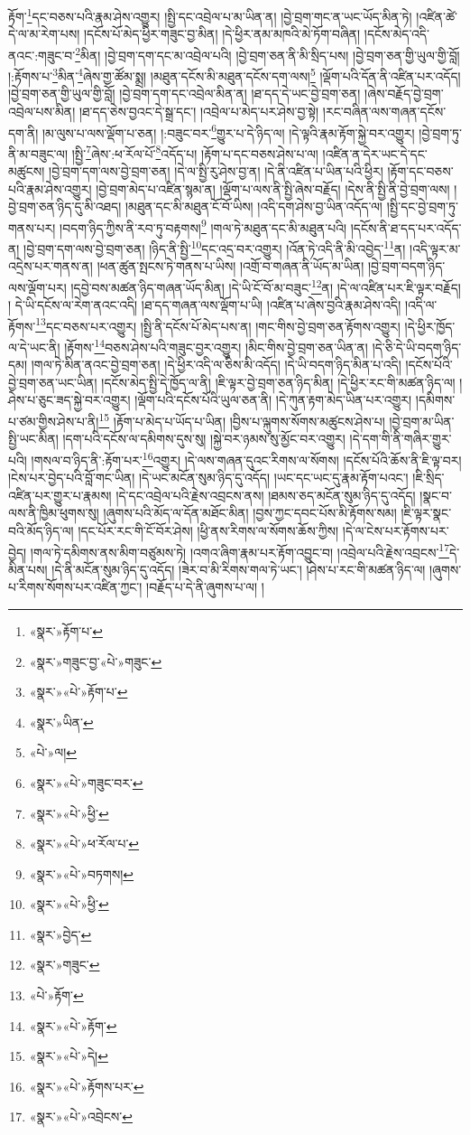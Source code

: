 རྟོག་\footnote{«སྣར་»རྟོག་པ་}དང་བཅས་པའི་རྣམ་ཤེས་འགྱུར། །སྤྱི་དང་འབྲེལ་པ་མ་ཡིན་ན། །བྱེ་བྲག་གང་ན་ཡང་ཡོད་མིན་ཏེ། །འཛིན་ཚེ་དེ་ལ་མ་རེག་པས། །དངོས་པོ་མེད་ཕྱིར་གཟུང་བྱ་མིན། །དེ་ཕྱིར་ནམ་མཁའི་མེ་ཏོག་བཞིན། །དངོས་མེད་འདི་ནའང་:གཟུང་བ་\footnote{«སྣར་»གཟུང་བྱ་«པེ་»གཟུང་}མིན། །བྱེ་བྲག་དག་དང་མ་འབྲེལ་པའི། །བྱེ་བྲག་ཅན་ནི་མི་སྲིད་པས། །བྱེ་བྲག་ཅན་གྱི་ཡུལ་གྱི་བློ། །:རྟོགས་པ་\footnote{«སྣར་»«པེ་»རྟོག་པ་}མིན་\footnote{«སྣར་»ཡིན་}ཞེས་གྱ་ཚོམ་སྨྲ། །མཐུན་དངོས་མི་མཐུན་དངོས་དག་ལས།\footnote{«པེ་»ལ།} །ལྡོག་པའི་དོན་ནི་འཛིན་པར་འདོད། །བྱེ་བྲག་ཅན་གྱི་ཡུལ་གྱི་བློ། །བྱེ་བྲག་དག་དང་འབྲེལ་མིན་ན། །ཐ་དད་དེ་ཡང་བྱེ་བྲག་ཅན། །ཞེས་བརྗོད་བྱེ་བྲག་འབྲེལ་པས་མིན། །ཐ་དད་ཅེས་བྱའང་དེ་སྒྲ་དང་། །འབྲེལ་པ་མེད་པར་ཤེས་བྱ་སྟེ། །རང་བཞིན་ལས་གཞན་དངོས་དག་ནི། །མ་ལུས་པ་ལས་ལྡོག་པ་ཅན། །:བཟུང་བར་\footnote{«སྣར་»«པེ་»གཟུང་བར་}གྱུར་པ་དེ་ཉིད་ལ། །དེ་ལྟའི་རྣམ་རྟོག་སྐྱེ་བར་འགྱུར། །བྱེ་བྲག་ཏུ་ནི་མ་བཟུང་ལ། །སྤྱི་\footnote{«སྣར་»«པེ་»ཕྱི་}ཞེས་:ཕ་རོལ་པོ་\footnote{«སྣར་»«པེ་»ཕ་རོལ་པ་}འདོད་པ། །རྟོག་པ་དང་བཅས་ཤེས་པ་ལ། །འཛིན་ན་དེར་ཡང་དེ་དང་མཚུངས། །བྱེ་བྲག་དག་ལས་བྱེ་བྲག་ཅན། །དེ་ལ་སྤྱི་རུ་ཤེས་བྱ་ན། །དེ་ནི་འཛིན་པ་ཡིན་པའི་ཕྱིར། །རྟོག་དང་བཅས་པའི་རྣམ་ཤེས་འགྱུར། །བྱེ་བྲག་མེད་པ་འཛིན་སྙམ་ན། །ལྡོག་པ་ལས་ནི་སྤྱི་ཞེས་བརྗོད། །དེས་ནི་སྤྱི་ནི་བྱེ་བྲག་ལས། །བྱེ་བྲག་ཅན་ཉིད་དུ་མི་འཐད། །མཐུན་དང་མི་མཐུན་ངོ་བོ་ཡིས། །འདི་དག་ཤེས་བྱ་ཡིན་འདོད་ལ། །སྤྱི་དང་བྱེ་བྲག་ཏུ་གནས་པར། །བདག་ཉིད་ཀྱིས་ནི་རབ་ཏུ་བརྟགས།\footnote{«སྣར་»«པེ་»བཏགས།} །གལ་ཏེ་མཐུན་དང་མི་མཐུན་པའི། །དངོས་ནི་ཐ་དད་པར་འདོད་ན། །བྱེ་བྲག་དག་ལས་བྱེ་བྲག་ཅན། །ཉིད་ནི་སྤྱི་\footnote{«སྣར་»«པེ་»ཕྱི་}དང་འདྲ་བར་འགྱུར། །འོན་ཏེ་འདི་ནི་མི་འབྱེད་\footnote{«སྣར་»བྱེད་}ན། །འདི་ལྟར་མ་འདྲེས་པར་གནས་ན། །ཕན་ཚུན་སྤངས་ཏེ་གནས་པ་ཡིས། །འགྲོ་བ་གཞན་ནི་ཡོད་མ་ཡིན། །བྱེ་བྲག་བདག་ཉིད་ལས་ལྡོག་པར། །དབྱེ་བས་མཚན་ཉིད་གཞན་ཡོད་མིན། །དེ་ཡི་ངོ་བོ་མ་བཟུང་\footnote{«སྣར་»གཟུང་}ན། །དེ་ལ་འཛིན་པར་ཇི་ལྟར་བརྗོད། །
དེ་ཡི་དངོས་ལ་རེག་ནའང་འདི། །ཐ་དད་གཞན་ལས་ལྡོག་པ་ཡི། །འཛིན་པ་ཞེས་བྱའི་རྣམ་ཤེས་འདི། །འདི་ལ་རྟོགས་\footnote{«པེ་»རྟོག་}དང་བཅས་པར་འགྱུར། །སྤྱི་ནི་དངོས་པོ་མེད་པས་ན། །གང་གིས་བྱེ་བྲག་ཅན་རྟོགས་འགྱུར། །དེ་ཕྱིར་ཁྱོད་ལ་དེ་ཡང་ནི། །རྟོགས་\footnote{«སྣར་»«པེ་»རྟོག་}བཅས་ཤེས་པའི་གཟུང་བྱར་འགྱུར། །མིང་གིས་བྱེ་བྲག་ཅན་ཡིན་ན། །དེ་ཅི་དེ་ཡི་བདག་ཉིད་དམ། །གལ་ཏེ་མིན་ནའང་བྱེ་བྲག་ཅན། །དེ་ཕྱིར་འདི་ལ་ཅིས་མི་འདོད། །དེ་ཡི་བདག་ཉིད་མིན་པ་འདི། །དངོས་པོའི་བྱེ་བྲག་ཅན་ཡང་ཡིན། །དངོས་མེད་སྤྱི་དེ་ཁྱོད་ལ་ནི། །ཇི་ལྟར་བྱེ་བྲག་ཅན་ཉིད་མིན། །དེ་ཕྱིར་རང་གི་མཚན་ཉིད་ལ། །ཤེས་པ་ཅུང་ཟད་སྐྱེ་བར་འགྱུར། །ལྡོག་པའི་དངོས་པོའི་ཡུལ་ཅན་ནི། །དེ་ཀུན་རྟག་མེད་ཡིན་པར་འགྱུར། །དམིགས་པ་ཙམ་གྱིས་ཤེས་པ་ནི།\footnote{«སྣར་»«པེ་»དེ།} །རྟོག་པ་མེད་པ་ཡོད་པ་ཡིན། །བྱིས་པ་ལྐུགས་སོགས་མཚུངས་ཤེས་པ། །བྱེ་བྲག་མ་ཡིན་སྤྱི་ཡང་མིན། །དག་པའི་དངོས་ལ་དམིགས་དུས་སུ། །སྐྱེ་བར་ཉམས་སུ་མྱོང་བར་འགྱུར། །དེ་དག་གི་ནི་གཞིར་གྱུར་པའི། །གསལ་བ་ཉིད་ནི་:རྟོག་པར་\footnote{«སྣར་»«པེ་»རྟོགས་པར་}འགྱུར། །དེ་ལས་གཞན་དུའང་རིགས་ལ་སོགས། །དངོས་པོའི་ཆོས་ནི་ཇི་ལྟ་བར། །ངེས་པར་བྱེད་པའི་བློ་གང་ཡིན། །དེ་ཡང་མངོན་སུམ་ཉིད་དུ་འདོད། །ཡང་དང་ཡང་དུ་རྣམ་རྟོག་པའང་། །ཇི་སྲིད་འཛིན་པར་གྱུར་པ་རྣམས། །དེ་དང་འབྲེལ་པའི་རྗེས་འབྲངས་ནས། །ཐམས་ཅད་མངོན་སུམ་ཉིད་དུ་འདོད། །སྣང་བ་ལས་ནི་ཁྱིམ་ཕུགས་སུ། །ཞུགས་པའི་མོད་ལ་དོན་མཐོང་མིན། །བྱས་ཀྱང་དབང་པོས་མི་རྟོགས་སམ། །ཇི་ལྟར་སྣང་བའི་མོད་ཉིད་ལ། །དང་པོར་རང་གི་ངོ་བོར་ཤེས། །ཕྱི་ནས་རིགས་ལ་སོགས་ཆོས་ཀྱིས། །དེ་ལ་ངེས་པར་རྟོགས་པར་བྱེད། །གལ་ཏེ་དམིགས་ནས་མིག་བཙུམས་ཏེ། །འགའ་ཞིག་རྣམ་པར་རྟོག་འབྱུང་བ། །འབྲེལ་པའི་རྗེས་འབྲངས་\footnote{«སྣར་»«པེ་»འབྲེངས་}དེ་མིན་པས། །དེ་ནི་མངོན་སུམ་ཉིད་དུ་འདོད། །ཟེར་བ་མི་རིགས་གལ་ཏེ་ཡང་། །ཤེས་པ་རང་གི་མཚན་ཉིད་ལ། །ཞུགས་པ་རིགས་སོགས་པར་འཛིན་ཀྱང་། །བརྗོད་པ་དེ་ནི་ཞུགས་པ་ལ། །
